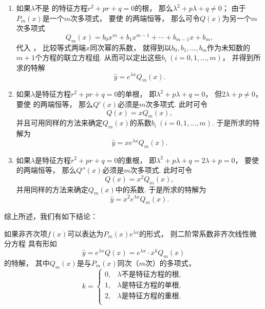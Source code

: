 \begin{enumerate}
\item 如果\(\lambda\)不是  的特征方程\(r^2+pr+q=0\)的根，
那么\(\lambda^2+p\lambda+q\neq0\)；
由于\(P_m(x)\)是一个\(m\)次多项式，
要使  的两端恒等，
那么可令\(Q(x)\)为另一个\(m\)次多项式\begin{equation}
	Q_m(x) = b_0 x^m + b_1 x^{m-1} + \dotsb + b_{m-1} x + b_m,
\end{equation}
代入 ，
比较等式两端\(x\)同次幂的系数，
就得到以\(b_0,b_1,\dotsc,b_m\)作为未知数的\(m+1\)个方程的联立方程组.
从而可以定出这些\(b_i\ (i=0,1,\dotsc,m)\)，
并得到所求的特解\begin{equation}
	\hat{y} = e^{\lambda x} Q_m(x).
\end{equation}

\item 如果\(\lambda\)是特征方程\(r^2+pr+q=0\)的单根，
即\(\lambda^2+p\lambda+q=0\)，
但\(2\lambda+p\neq0\)，
要使  的两端恒等，
那么\(Q'(x)\)必须是\(m\)次多项式.
此时可令\[
	Q(x) = x Q_m(x),
\]
并且可用同样的方法来确定\(Q_m(x)\)的系数\(b_i\ (i=0,1,\dotsc,m)\).
于是所求的特解为\begin{equation}
	\hat{y} = x e^{\lambda x} Q_m(x).
\end{equation}

\item 如果\(\lambda\)是特征方程\(r^2+pr+q=0\)的重根，
即\(\lambda^2+p\lambda+q=2\lambda+p=0\)，
要使  的两端恒等，
那么\(Q''(x)\)必须是\(m\)次多项式.
此时可令\[
	Q(x) = x^2 Q_m(x),
\]
并用同样的方法来确定\(Q_m(x)\)中的系数.
于是所求的特解为\begin{equation}
	\hat{y} = x^2 e^{\lambda x} Q_m(x).
\end{equation}
\end{enumerate}

综上所述，我们有如下结论：
\begin{proposition}
如果非齐次项\(f(x)\)可以表达为\(P_m(x) e^{\lambda x}\)的形式，
则二阶常系数非齐次线性微分方程  具有形如
\begin{equation}\label{equation:微分方程.二阶常系数齐次线性微分方程.特解1}
	\hat{y} = e^{\lambda x} Q(x)
	= e^{\lambda x} \cdot x^k Q_m(x)
\end{equation}的特解，
其中\(Q_m(x)\)是与\(P_m(x)\)同次（\(m\)次）的多项式，\[
	k = \left\{ \begin{array}{ll}
		0, & \text{\(\lambda\)不是特征方程的根}, \\
		1, & \text{\(\lambda\)是特征方程的单根}, \\
		2, & \text{\(\lambda\)是特征方程的重根}. \\
	\end{array} \right.
\]
\end{proposition}

